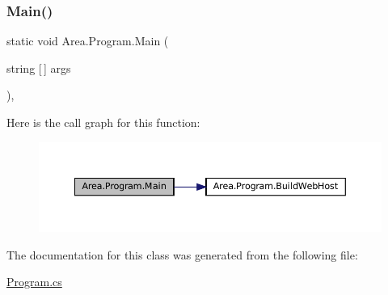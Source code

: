 \mbox{\label{classArea_1_1Program_a3d170d98ebe8cc51ab2fcb4b23684264}} 
\subsubsection{\texorpdfstring{Main()}{Main()}}
{\footnotesize\ttfamily static void Area.\+Program.\+Main (\begin{DoxyParamCaption}\item[{string \mbox{[}$\,$\mbox{]}}]{args }\end{DoxyParamCaption})\hspace{0.3cm}{\ttfamily [inline]}, {\ttfamily [static]}}

Here is the call graph for this function\+:
\nopagebreak
\begin{figure}[H]
\begin{center}
\leavevmode
\includegraphics[width=350pt]{classArea_1_1Program_a3d170d98ebe8cc51ab2fcb4b23684264_cgraph}
\end{center}
\end{figure}


The documentation for this class was generated from the following file\+:\begin{DoxyCompactItemize}
\item 
\mbox{\hyperlink{Program_8cs}{Program.\+cs}}\end{DoxyCompactItemize}
